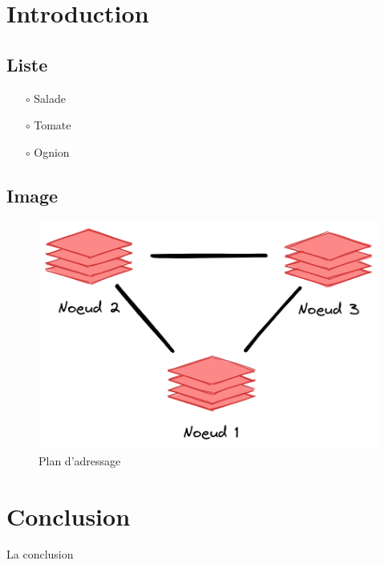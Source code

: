 \documentclass[12pt]{article}
\begin{document}
\tableofcontents
\newpage

\section{Introduction}
\subsection{Liste}

\begin{enumerate}
\item [$\circ$] Salade
\item [$\circ$] Tomate
\item [$\circ$] Ognion
\end{enumerate}

\subsection{Image}

\begin{figure}[htp!]
  \centering
  \includegraphics[width=1\textwidth]{assets/screenshots/noeuds.png}
  \caption{Plan d'adressage}
  \label{fig:figure1}
\end{figure}

\section{Conclusion}

La conclusion
\end{document}
